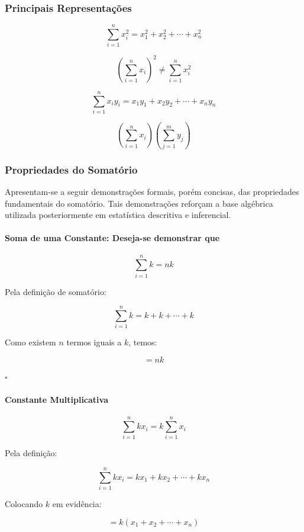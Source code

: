 \subsubsection{Principais Representações}

\[
\sum_{i=1}^{n} x_i^2 = x_1^2 + x_2^2 + \cdots + x_n^2
\]

\[
\left( \sum_{i=1}^{n} x_i \right)^2 \neq \sum_{i=1}^{n} x_i^2
\]

\[
\sum_{i=1}^{n} x_i y_i = x_1y_1 + x_2y_2 + \cdots + x_ny_n
\]

\[
\left( \sum_{i=1}^{n} x_i \right)
\left( \sum_{j=1}^{m} y_j \right)
\]

\newpage
\subsubsection{Propriedades do Somatório}

Apresentam-se a seguir demonstrações formais, porém concisas, das propriedades fundamentais do somatório. Tais demonstrações reforçam a base algébrica utilizada posteriormente em estatística descritiva e inferencial.

\paragraph{Soma de uma Constante: Deseja-se demonstrar que} 

\[
\sum_{i=1}^{n} k = nk
\]

Pela definição de somatório:

\[
\sum_{i=1}^{n} k = k + k + \cdots + k
\]

Como existem $n$ termos iguais a $k$, temos:

\[
= nk
\]

\hfill $\square$

\paragraph{Constante Multiplicativa}

\[
\sum_{i=1}^{n} kx_i = k \sum_{i=1}^{n} x_i
\]

Pela definição:

\[
\sum_{i=1}^{n} kx_i = kx_1 + kx_2 + \cdots + kx_n
\]

Colocando $k$ em evidência:

\[
= k(x_1 + x_2 + \cdots + x_n)
\]

